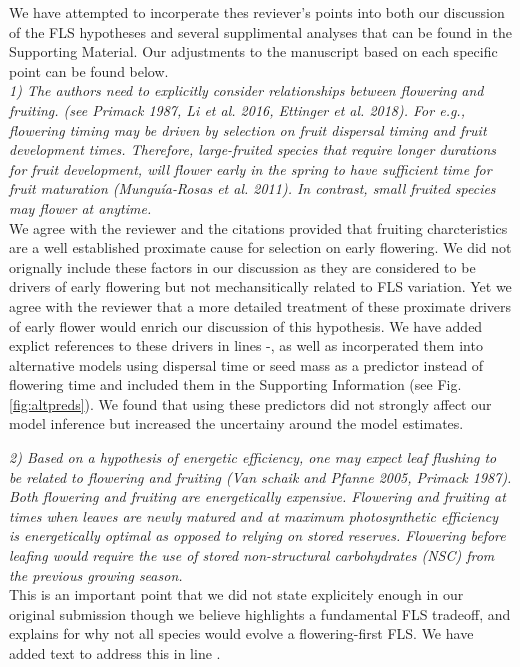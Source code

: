 \documentclass{article}[11pt]
\begin{document}
\noindent We have attempted to incorperate thes reviever's points into both our discussion of the FLS hypotheses and several supplimental analyses that can be found in the Supporting Material. Our adjustments to the manuscript based on each specific point can be found below.\\

\emph{1) The authors need to explicitly consider relationships between flowering and fruiting. (see Primack 1987, Li et al. 2016, Ettinger et al. 2018). For e.g., flowering timing may be driven by selection on fruit dispersal timing and fruit development times. Therefore, large-fruited species that require longer durations for fruit development, will flower early in the spring to have sufficient time for fruit maturation (Munguía‐Rosas et al. 2011). In contrast, small fruited species may flower at anytime.}\\

\noindent We agree with the reviewer and the citations provided that fruiting charcteristics are a well established proximate cause for selection on early flowering. We did not orignally include these factors in our discussion as they are considered to be drivers of early flowering but not mechansitically related to FLS variation. Yet we agree with the reviewer that a more detailed treatment of these proximate drivers of early flower would enrich our discussion of this hypothesis. We have added explict references to these drivers in lines -, as well as incorperated them into alternative models using dispersal time or seed mass as a predictor instead of flowering time and included them in the Supporting Information (see Fig. \ref{fig:altpreds}). We found that using these predictors did not strongly affect our model inference but increased the uncertainy around the model estimates.

\emph{2) Based on a hypothesis of energetic efficiency, one may expect leaf flushing to be related to flowering and fruiting (Van schaik and Pfanne 2005, Primack 1987). Both flowering and fruiting are energetically expensive. Flowering and fruiting at times when leaves are newly matured and at maximum photosynthetic efficiency is energetically optimal as opposed to relying on stored reserves. Flowering before leafing would require the use of stored non-structural carbohydrates (NSC) from the previous growing season.}\\

\noindent This is an important point that we did not state explicitely enough in our original submission though we believe highlights a fundamental FLS tradeoff, and explains for why not all species would evolve a flowering-first FLS. We have added text to address this in line .\\
\end{document}
